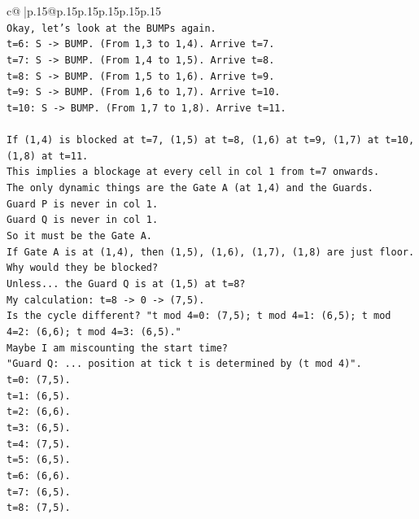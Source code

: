 \documentclass{article}
\begin{document}
{\begin{supertabular}{c@{$\;$}|p{.15\linewidth}@{}p{.15\linewidth}p{.15\linewidth}p{.15\linewidth}p{.15\linewidth}p{.15\linewidth}}
{{{\\ 
\texttt{Okay, let's look at the BUMPs again.} \\
\texttt{t=6: S {-}> BUMP. (From 1,3 to 1,4). Arrive t=7.} \\
\texttt{t=7: S {-}> BUMP. (From 1,4 to 1,5). Arrive t=8.} \\
\texttt{t=8: S {-}> BUMP. (From 1,5 to 1,6). Arrive t=9.} \\
\texttt{t=9: S {-}> BUMP. (From 1,6 to 1,7). Arrive t=10.} \\
\texttt{t=10: S {-}> BUMP. (From 1,7 to 1,8). Arrive t=11.} \\
\\ 
\texttt{If (1,4) is blocked at t=7, (1,5) at t=8, (1,6) at t=9, (1,7) at t=10, (1,8) at t=11.} \\
\texttt{This implies a blockage at every cell in col 1 from t=7 onwards.} \\
\texttt{The only dynamic things are the Gate A (at 1,4) and the Guards.} \\
\texttt{Guard P is never in col 1.} \\
\texttt{Guard Q is never in col 1.} \\
\texttt{So it must be the Gate A.} \\
\texttt{If Gate A is at (1,4), then (1,5), (1,6), (1,7), (1,8) are just floor.} \\
\texttt{Why would they be blocked?} \\
\texttt{Unless... the Guard Q is at (1,5) at t=8?} \\
\texttt{My calculation: t=8 {-}> 0 {-}> (7,5).} \\
\texttt{Is the cycle different? "t mod 4=0: (7,5); t mod 4=1: (6,5); t mod 4=2: (6,6); t mod 4=3: (6,5)."} \\
\texttt{Maybe I am miscounting the start time?} \\
\texttt{"Guard Q: ... position at tick t is determined by (t mod 4)".} \\
\texttt{t=0: (7,5).} \\
\texttt{t=1: (6,5).} \\
\texttt{t=2: (6,6).} \\
\texttt{t=3: (6,5).} \\
\texttt{t=4: (7,5).} \\
\texttt{t=5: (6,5).} \\
\texttt{t=6: (6,6).} \\
\texttt{t=7: (6,5).} \\
\texttt{t=8: (7,5).} \\
}}}
\end{supertabular}}
\end{document}
